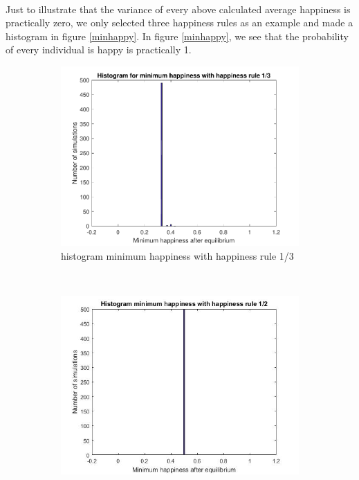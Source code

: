 \\
Just to illustrate that the variance of every above calculated average happiness is practically zero, we only selected three happiness rules as an example and made a histogram in figure \ref{minhappy}. In figure \ref{minhappy}, we see that the probability of every individual is happy is practically 1.
\newpage
\begin{figure}[H]
    \centering
    \begin{subfigure}{0.32\textwidth}
        \includegraphics[width=\textwidth]{histogram_min_happiness_een_derde}
        \caption{histogram minimum happiness with happiness rule 1/3}
        \label{fig:gull}
    \end{subfigure}
    ~ %
    \begin{subfigure}{0.32\textwidth}
        \includegraphics[width=\textwidth]{histogram_min_happiness_half}

\end{subfigure}
\end{figure}

